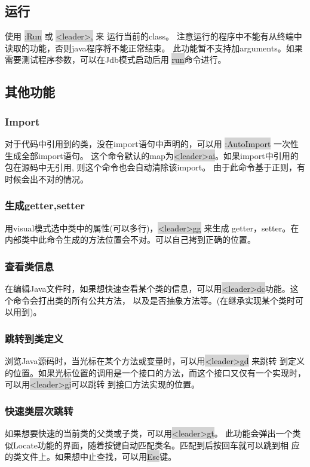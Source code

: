 \documentclass[oneside,openany]{book}
\begin{document}
\subsection{运行}
    使用 \colorbox{lightgray}{:Run} 或 \colorbox{lightgray}{<leader>,} 来 运行当前的class。
注意运行的程序中不能有从终端中读取的功能，否则java程序将不能正常结束。
此功能暂不支持加arguments。如果需要测试程序参数，可以在Jdb模式启动后用 \colorbox{lightgray}{run}命令进行。

\subsection{其他功能}

\subsubsection{Import}
    对于代码中引用到的类，没在import语句中声明的，可以用 \colorbox{lightgray}{:AutoImport} 一次性生成全部import语句。 
这个命令默认的map为\colorbox{lightgray}{<leader>ai}。如果import中引用的包在源码中无引用, 则这个命令也会自动清除该import。
由于此命令基于正则，有时候会出不对的情况。

\subsubsection{生成getter,setter}
    用visual模式选中类中的属性(可以多行)，\colorbox{lightgray}{<leader>gg} 来生成 getter，setter。在内部类中此命令生成的方法位置会不对。可以自己拷到正确的位置。

\subsubsection{查看类信息}
   在编辑Java文件时，如果想快速查看某个类的信息，可以用\colorbox{lightgray}{<leader>dc}功能。这个命令会打出类的所有公共方法，
以及是否抽象方法等。(在继承实现某个类时可以用到)。

\subsubsection{跳转到类定义}
浏览Java源码时，当光标在某个方法或变量时，可以用\colorbox{lightgray}{<leader>gd} 来跳转
到定义的位置。如果光标位置的调用是一个接口的方法，而这个接口又仅有一个实现时，可以用\colorbox{lightgray}{<leader>gi}可以跳转
到接口方法实现的位置。

\subsubsection{快速类层次跳转}
  如果想要快速的当前类的父类或子类，可以用\colorbox{lightgray}{<leader>gt}。
此功能会弹出一个类似Locate功能的界面，随着按键自动匹配类名。匹配到后按回车就可以跳到相
应的类文件上。如果想中止查找，可以用\colorbox{lightgray}{Esc}键。
\end{document}
